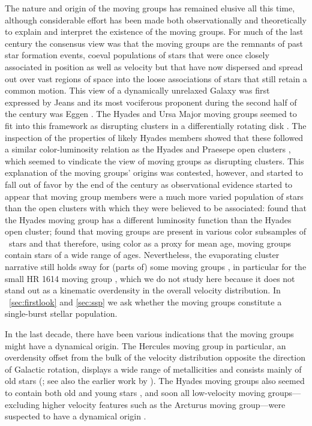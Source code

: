 The nature and origin of the moving groups has remained elusive all
this time, although considerable effort has been made both
observationally and theoretically to explain and interpret the
existence of the moving groups. For much of the last century the
consensus view was that the moving groups are the remnants of past
star formation events, coeval populations of stars that were once
closely associated in position as well as velocity but that have now
dispersed and spread out over vast regions of space into the loose
associations of stars that still retain a common motion. This view of
a dynamically unrelaxed Galaxy was first expressed by Jeans
\citep{Jeans15a} and its most vociferous proponent during the second
half of the century was Eggen \citep[\eg,][]{Eggen96a}. The Hyades and
Ursa Major moving groups seemed to fit into this framework as
disrupting clusters in a differentially rotating disk
\citep{Bok34a,Bok36a,Bok46a}. The inspection of the properties of
likely Hyades members showed that these followed a similar
color-luminosity relation as the Hyades and Praesepe open clusters
\citep{Eggen58a}, which seemed to vindicate the view of moving groups
as disrupting clusters. This explanation of the moving groups' origins
was contested, however,
\citep[\eg,][]{1968PASP...80..578B,Wielen71a,1971MNRAS.153..171W,1987AJ.....93..920S,1988ApJ...332..410B}
and started to fall out of favor by the end of the century as
observational evidence started to appear that moving group members
were a much more varied population of stars than the open clusters
with which they were believed to be associated: \citet{Eggen93a} found
that the Hyades moving group has a different luminosity function than
the Hyades open cluster; \citet{1998AJ....115.2384D} found that moving
groups are present in various color subsamples of \Hipparcos\ stars
and that therefore, using color as a proxy for mean age, moving groups
contain stars of a wide range of ages. Nevertheless, the evaporating
cluster narrative still holds sway for (parts of) some moving groups
\citep{Asiain99a}, in particular for the small HR 1614 moving group
\citep{Feltzing00a,DeSilva07a}, which we do not study here because it
does not stand out as a kinematic overdensity in the overall velocity
distribution. In \sectionname\sectionname~\ref{sec:firstlook} and
\ref{sec:ssp} we ask whether the moving groups constitute a
single-burst stellar population.

In the last decade, there have been various indications that the
moving groups might have a dynamical origin. The Hercules moving group
in particular, an overdensity offset from the bulk of the velocity
distribution opposite the direction of Galactic rotation, displays a
wide range of metallicities \citep{Raboud98a,Bensby07a} and consists
mainly of old stars (\citealt{Caloi99a}; see also the earlier work by
\citealt{Blaauw70a}). The Hyades moving groups also seemed to contain
both old and young stars \citep{Chereul01a}, and soon all low-velocity
moving groups---excluding higher velocity features such as the
Arcturus moving group---were suspected to have a dynamical origin
\citep{2005A&A...430..165F,Famaey07a,Famaey08a}.

